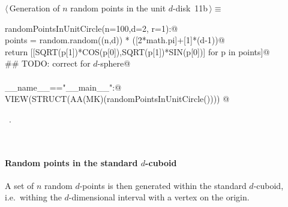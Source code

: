 \documentclass[11pt,oneside]{article}	%
\begin{document}
\begin{flushleft} \small
\begin{minipage}{\linewidth} \label{scrap17}
\protect{}$\langle\,$Generation of $n$ random points in the unit $d$-disk\nobreak\ {\footnotesize 11b}$\,\rangle\equiv$
\vspace{-1ex}
\begin{list}{}{} \item
\mbox{}\verb@def randomPointsInUnitCircle(n=100,d=2, r=1):@\\
\mbox{}\verb@   points = random.random((n,d)) * ([2*math.pi]+[1]*(d-1))@\\
\mbox{}\verb@   return [[SQRT(p[1])*COS(p[0]),SQRT(p[1])*SIN(p[0])] for p in points]@\\
\mbox{}\verb@   ## TODO: correct for $d$-sphere@\\
\mbox{}\verb@@\\
\mbox{}\verb@if __name__=="__main__":@\\
\mbox{}\verb@   VIEW(STRUCT(AA(MK)(randomPointsInUnitCircle()))) @\\
\mbox{}\verb@@{\NWsep}
\end{list}
\vspace{-1ex}
\footnotesize\addtolength{\baselineskip}{-1ex}
\begin{list}{}{\setlength{\itemsep}{-\parsep}\setlength{\itemindent}{-\leftmargin}}
\item \NWtxtMacroRefIn\ .
\end{list}
\end{minipage}\\[4ex]
\end{flushleft}

\paragraph{Random points in the standard $d$-cuboid} 
A set of $n$ random $d$-points is then generated within the standard $d$-cuboid, i.e.~withing the $d$-dimensional interval with a vertex on the origin.
\end{document}
